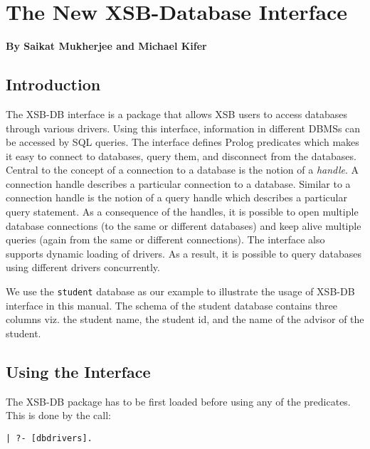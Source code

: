 \chapter{The New XSB-Database Interface} \label{db_interface}

\begin{center}
{\Large {\bf By Saikat Mukherjee and Michael Kifer }}
\end{center}

\section{Introduction}

The XSB-DB interface is a package that allows XSB users to access
databases through various drivers. Using this interface, information
in different DBMSs can be accessed by SQL queries. The interface defines
Prolog predicates which makes it easy to connect to databases, 
query them, and disconnect from the databases. Central to the 
concept of a connection to a database is the notion of a \emph{handle}.
A connection handle describes a particular connection to a database.
Similar to a connection handle is the notion of a query handle which
describes a particular query statement. As a consequence of the handles,
it is possible to open multiple database connections (to the same or
different databases) and keep alive multiple queries (again from the
same or different connections). The interface also supports dynamic loading of
drivers. As a result, it is possible to query databases using different drivers
concurrently.

We use the {\tt student} database as our example to illustrate 
the usage of XSB-DB interface in this manual. The schema of the
student database contains three columns viz. the student name, 
the student id, and the name of the advisor of the student.

\section{Using the Interface}

The XSB-DB package has to be first loaded before using any of the
predicates. This is done by the call:

\begin{verbatim}
| ?- [dbdrivers].
\end{verbatim}

